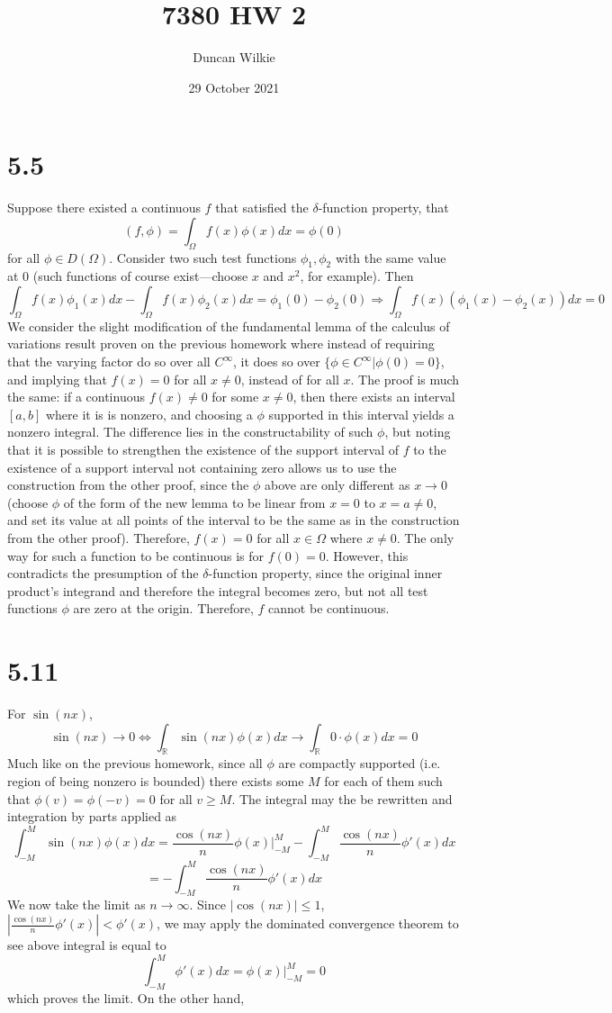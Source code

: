 \documentclass{article}
\title{7380 HW 2}
\author{Duncan Wilkie}
\date{29 October 2021}
\begin{document}
\maketitle

\section*{5.5}
Suppose there existed a continuous $f$ that satisfied the $\delta$-function property, that
\[(f,\phi)=\int_\Omega f(x)\phi(x)dx=\phi(0)\] for all $\phi\in D(\Omega)$. Consider two such test functions $\phi_1,\phi_2$ with the same value at 0 (such functions of course exist---choose $x$ and $x^2$, for example). Then
\[\int_\Omega f(x)\phi_1(x)dx-\int_\Omega f(x)\phi_2(x)dx = \phi_1(0)-\phi_2(0)\Rightarrow \int_\Omega f(x)(\phi_1(x)-\phi_2(x))dx = 0\]
We consider the slight modification of the fundamental lemma of the calculus of variations result proven on the previous homework where instead of requiring that the varying factor do so over all $C^\infty$, it does so over $\{\phi\in C^\infty| \phi(0)=0\}$, and implying that $f(x)=0$ for all $x\neq 0 $, instead of for all $x$. The proof is much the same: if a continuous $f(x)\neq 0$ for some $x\neq 0$, then there exists an interval $[a,b]$ where it is is nonzero, and choosing a $\phi$ supported in this interval yields a nonzero integral. The difference lies in the constructability of such $\phi$, but noting that it is possible to strengthen the existence of the support interval of $f$ to the existence of a support interval not containing zero allows us to use the construction from the other proof, since the $\phi$ above are only different as $x\to 0$ (choose $\phi$ of the form of the new lemma to be linear from $x=0$ to $x=a\neq 0$, and set its value at all points of the interval to be the same as in the construction from the other proof). Therefore, $f(x) = 0$ for all $x\in\Omega$ where $ x\neq 0$. The only way for such a function to be continuous is for $f(0)=0$.
However, this contradicts the presumption of the $\delta$-function property, since the original inner product's integrand and therefore the integral becomes zero, but not all test functions $\phi$ are zero at the origin. Therefore, $f$ cannot be continuous.
\section*{5.11}
For $\sin(nx)$,
\[\sin(nx)\to 0\Leftrightarrow\int_\mathbb{R}\sin(nx)\phi(x)dx\to \int_\mathbb{R}0\cdot\phi(x)dx=0\]
Much like on the previous homework, since all $\phi$ are compactly supported (i.e. region of being nonzero is bounded) there exists some $M$ for each of them such that $\phi(v)=\phi(-v)=0$ for all $v\geq M$. The integral may the be rewritten and integration by parts applied as
\[\int_{-M}^M\sin(nx)\phi(x)dx=\frac{\cos(nx)}{n}\phi(x)\bigg|_{-M}^M-\int_{-M}^M\frac{\cos(nx)}{n}\phi'(x)dx\]
\[=-\int_{-M}^M\frac{\cos(nx)}{n}\phi'(x)dx\]
We now take the limit as $n\to\infty$. Since $|\cos(nx)|\leq 1$, $|\frac{\cos(nx)}{n}\phi'(x)| < \phi'(x)$, we may apply the dominated convergence theorem to see above integral is equal to
\[\int_{-M}^M\phi'(x)dx=\phi(x)\bigg|_{-M}^M=0\]
which proves the limit. On the other hand,
\end{document}
